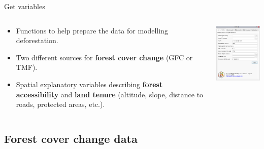 \documentclass[10pt,table,dvipsnames,compress]{beamer}
\begin{document}
\begin{frame}[label={sec:orgb3013e4}]{Get variables}
\begin{columns}
\begin{column}{0.5\columnwidth}
\begin{itemize}
\item Functions to help prepare the data for modelling deforestation.
\item Two different sources for \textbf{forest cover change} (GFC or TMF).
\item Spatial explanatory variables describing \textbf{forest accessibility} and
\textbf{land tenure} (altitude, slope, distance to roads, protected areas, etc.).
\end{itemize}
\end{column}

\begin{column}{0.5\columnwidth}
\begin{center}
\includegraphics[width=5cm]{figs/plugin_api/interface_variables.png}
\end{center}
\end{column}
\end{columns}
\end{frame}

\subsection{Forest cover change data}
\label{sec:orgcf5ecd8}
\end{document}
